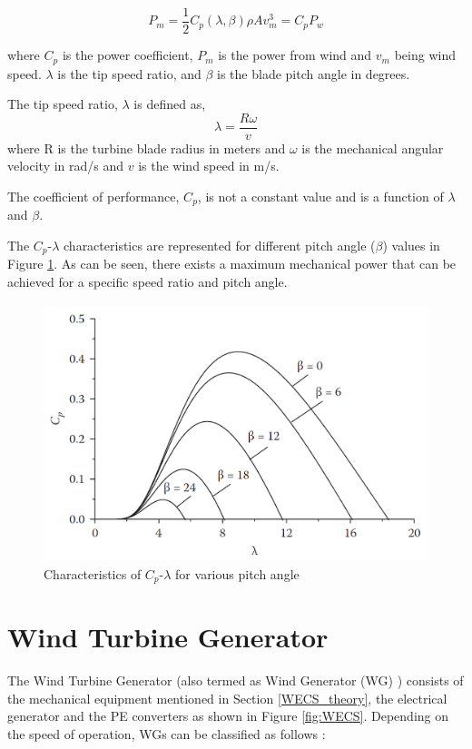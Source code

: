 \begin{equation}\label{windenergy}
    P_m =\frac{1}{2} C_p(\lambda,\beta) \rho A v_m^3 = C_p P_w
\end{equation}

where $C_p$ is the power coefficient, $P_m$ is the power from wind and $v_m$ being wind speed. $\lambda$ is the tip speed ratio, and $\beta$ is the blade pitch angle in degrees. 

The tip speed ratio, $\lambda$ is defined as,
\begin{equation}
\lambda= \frac{R\omega}{v} 
\end{equation}
where R is the turbine blade radius in meters and $\omega$ is the mechanical angular velocity in rad/s and $v$ is the wind speed in m/s.    

The coefficient of performance, $C_p$, is not a constant value and is a function of $\lambda$ and $\beta$.

The $C_p$-$\lambda$ characteristics are represented for different pitch angle ($\beta$) values in Figure \ref{fig:pitchangle}. As can be seen, there exists a maximum mechanical power that can be achieved for a specific speed ratio and pitch angle.

\begin{figure}[H]
\centering
    \includegraphics[height = 7.5cm,width = 11.5cm]{Diagrams/Chapter_2/pitchangle_1.png}
    \caption{Characteristics of $C_p$-$\lambda$ for various pitch angle \cite{ali_wind_2012}}
    \label{fig:pitchangle}
\end{figure}

\section{Wind Turbine Generator}
The Wind Turbine Generator (also termed as Wind Generator (\gls{WG}) ) consists of the mechanical equipment mentioned in Section \ref{WECS_theory}, the electrical generator and the \gls{PE} converters as shown in Figure \ref{fig:WECS}. Depending on the speed of operation, \gls{WG}s can be classified as follows \cite{ali_wind_2012}:

